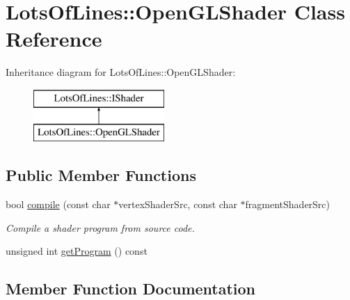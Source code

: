 \hypertarget{class_lots_of_lines_1_1_open_g_l_shader}{}\section{Lots\+Of\+Lines\+:\+:Open\+G\+L\+Shader Class Reference}
\label{class_lots_of_lines_1_1_open_g_l_shader}
Inheritance diagram for Lots\+Of\+Lines\+:\+:Open\+G\+L\+Shader\+:\begin{figure}[H]
\begin{center}
\leavevmode
\includegraphics[height=2.000000cm]{class_lots_of_lines_1_1_open_g_l_shader}
\end{center}
\end{figure}
\subsection*{Public Member Functions}
\begin{DoxyCompactItemize}
\item 
bool \hyperlink{class_lots_of_lines_1_1_open_g_l_shader_a0993e2f4c498d275c2d4cab3775c16ce}{compile} (const char $\ast$vertex\+Shader\+Src, const char $\ast$fragment\+Shader\+Src)\hypertarget{class_lots_of_lines_1_1_open_g_l_shader_a0993e2f4c498d275c2d4cab3775c16ce}{}\label{class_lots_of_lines_1_1_open_g_l_shader_a0993e2f4c498d275c2d4cab3775c16ce}

\begin{DoxyCompactList}\small\item\em Compile a shader program from source code. \end{DoxyCompactList}\item 
unsigned int \hyperlink{class_lots_of_lines_1_1_open_g_l_shader_aba045256064bef643f0826da88fa7450}{get\+Program} () const 
\end{DoxyCompactItemize}


\subsection{Member Function Documentation}
